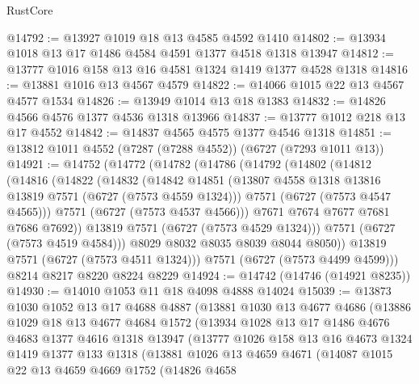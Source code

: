 \begin{lexlean}{RustCore}
\begin{coremodule}
@14792 := @13927 @1019 @18 @13 @4585 @4592 @1410
@14802 := @13934 @1018 @13 @17 @1486 @4584 @4591 @1377 @4518 @1318 @13947
@14812 := @13777 @1016 @158 @13 @16 @4581 @1324 @1419 @1377 @4528 @1318
@14816 := @13881 @1016 @13 @4567 @4579
@14822 := @14066 @1015 @22 @13 @4567 @4577 @1534
@14826 := @13949 @1014 @13 @18 @1383
@14832 := @14826 @4566 @4576 @1377 @4536 @1318 @13966
@14837 := @13777 @1012 @218 @13 @17 @4552
@14842 := @14837 @4565 @4575 @1377 @4546 @1318
@14851 := @13812 @1011 @4552 (@7287 (@7288 @4552)) (@6727 (@7293 @1011 @13))
@14921 := @14752
    (@14772
      (@14782
        (@14786
          (@14792
            (@14802
              (@14812
                (@14816
                  (@14822
                    (@14832
                      (@14842
                        @14851
                        (@13807 @4558 @1318 @13816 @13819 @7571 (@6727 (@7573 @4559 @1324)))
                        @7571
                        (@6727 (@7573 @4547 @4565)))
                      @7571
                      (@6727 (@7573 @4537 @4566)))
                    @7671
                    @7674
                    @7677
                    @7681
                    @7686
                    @7692))
                @13819
                @7571
                (@6727 (@7573 @4529 @1324)))
              @7571
              (@6727 (@7573 @4519 @4584)))
            @8029
            @8032
            @8035
            @8039
            @8044
            @8050))
        @13819
        @7571
        (@6727 (@7573 @4511 @1324)))
      @7571
      (@6727 (@7573 @4499 @4599)))
    @8214
    @8217
    @8220
    @8224
    @8229
@14924 := @14742 (@14746 (@14921 @8235))
@14930 := @14010 @1053 @11 @18 @4098 @4888 @14024
@15039 := @13873
    @1030
    @1052
    @13
    @17
    @4688
    @4887
    (@13881
      @1030
      @13
      @4677
      @4686
      (@13886
        @1029
        @18
        @13
        @4677
        @4684
        @1572
        (@13934
          @1028
          @13
          @17
          @1486
          @4676
          @4683
          @1377
          @4616
          @1318
          @13947
          (@13777
            @1026
            @158
            @13
            @16
            @4673
            @1324
            @1419
            @1377
            @133
            @1318
            (@13881
              @1026
              @13
              @4659
              @4671
              (@14087
                @1015
                @22
                @13
                @4659
                @4669
                @1752
                (@14826
                  @4658

\end{coremodule}
\end{lexlean}

